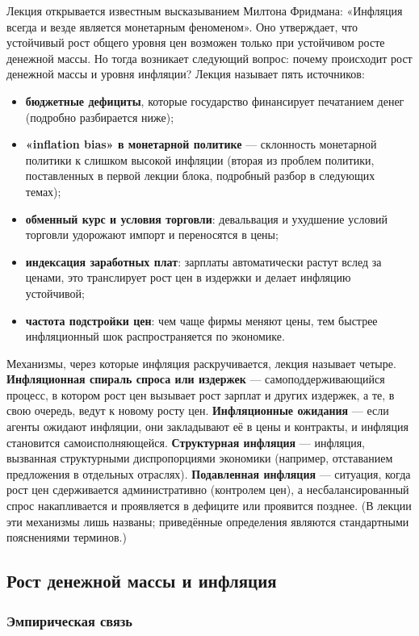 \documentclass[11pt,a4paper]{article}
\begin{document}
Лекция открывается известным высказыванием Милтона Фридмана: «Инфляция всегда и везде является монетарным феноменом». Оно утверждает, что устойчивый рост общего уровня цен возможен только при устойчивом росте денежной массы. Но тогда возникает следующий вопрос: почему происходит рост денежной массы и уровня инфляции? Лекция называет пять источников:
\begin{itemize}[leftmargin=1.5em]
\item \textbf{бюджетные дефициты}, которые государство финансирует печатанием денег (подробно разбирается ниже);
\item \textbf{«inflation bias» в монетарной политике} --- склонность монетарной политики к слишком высокой инфляции (вторая из проблем политики, поставленных в первой лекции блока, подробный разбор в следующих темах);
\item \textbf{обменный курс и условия торговли}: девальвация и ухудшение условий торговли удорожают импорт и переносятся в цены;
\item \textbf{индексация заработных плат}: зарплаты автоматически растут вслед за ценами, это транслирует рост цен в издержки и делает инфляцию устойчивой;
\item \textbf{частота подстройки цен}: чем чаще фирмы меняют цены, тем быстрее инфляционный шок распространяется по экономике.
\end{itemize}
Механизмы, через которые инфляция раскручивается, лекция называет четыре. \textbf{Инфляционная спираль спроса или издержек} --- самоподдерживающийся процесс, в котором рост цен вызывает рост зарплат и других издержек, а те, в свою очередь, ведут к новому росту цен. \textbf{Инфляционные ожидания} --- если агенты ожидают инфляции, они закладывают её в цены и контракты, и инфляция становится самоисполняющейся. \textbf{Структурная инфляция} --- инфляция, вызванная структурными диспропорциями экономики (например, отставанием предложения в отдельных отраслях). \textbf{Подавленная инфляция} --- ситуация, когда рост цен сдерживается административно (контролем цен), а несбалансированный спрос накапливается и проявляется в дефиците или проявится позднее. (В лекции эти механизмы лишь названы; приведённые определения являются стандартными пояснениями терминов.)

\subsection{Рост денежной массы и инфляция}

\subsubsection{Эмпирическая связь}
\end{document}
